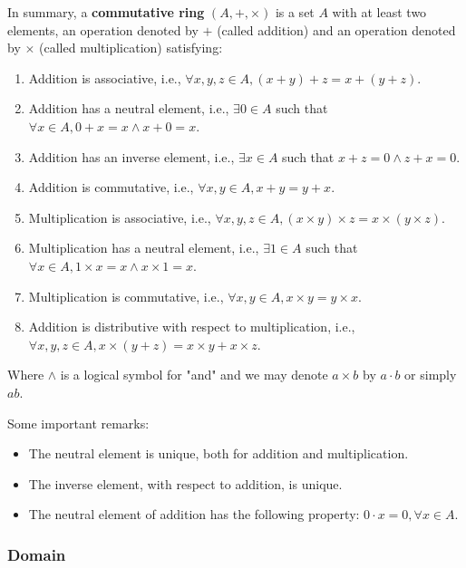 \documentclass[
]{article}
\begin{document}
In summary, a \textbf{commutative ring} \((A, +, \times)\) is a set
\(A\) with at least two elements, an operation denoted by \(+\) (called
addition) and an operation denoted by \(\times\) (called multiplication)
satisfying:

\begin{enumerate}
\def\labelenumi{\arabic{enumi}.}
\item
  Addition is associative, i.e.,
  \(\forall x,y,z \in A, (x+y)+z = x+(y+z)\).
\item
  Addition has a neutral element, i.e., \(\exists 0 \in A\) such that
  \(\forall x \in A, 0+x = x \land x+0 = x\).
\item
  Addition has an inverse element, i.e., \(\exists x \in A\) such that
  \(x+z = 0 \land z+x = 0\).
\item
  Addition is commutative, i.e., \(\forall x, y \in A, x+y = y+x\).
\item
  Multiplication is associative, i.e.,
  \(\forall x, y, z \in A, (x \times y) \times z = x \times (y \times z)\).
\item
  Multiplication has a neutral element, i.e., \(\exists 1 \in A\) such
  that \(\forall x \in A, 1 \times x = x \land x \times 1 = x\).
\item
  Multiplication is commutative, i.e.,
  \(\forall x, y \in A, x \times y = y \times x\).
\item
  Addition is distributive with respect to multiplication, i.e.,
  \(\forall x, y, z \in A, x \times (y + z) = x \times y + x \times z\).
\end{enumerate}

Where \(\land\) is a logical symbol for "and" and we may denote
\(a \times b\) by \(a \cdot b\) or simply \(ab\).

Some important remarks:

\begin{itemize}
\item
  The neutral element is unique, both for addition and multiplication.
\item
  The inverse element, with respect to addition, is unique.
\item
  The neutral element of addition has the following property:
  \(0 \cdot x = 0, \forall x \in A\).
\end{itemize}

\hypertarget{domain}{%
\subsubsection{\texorpdfstring{Domain }{Domain }}\label{domain}}
\end{document}
